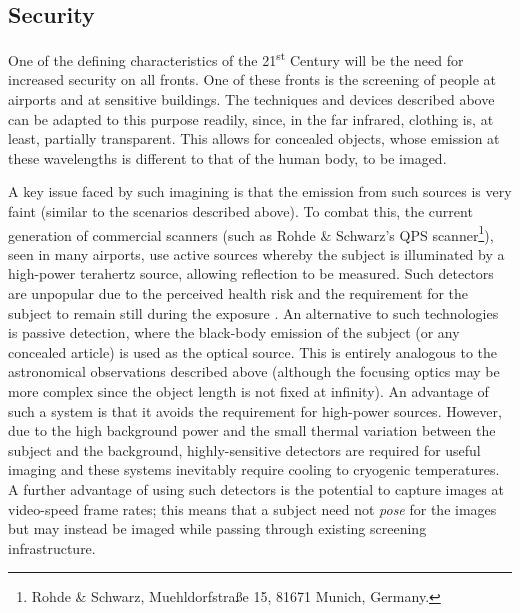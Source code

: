 \subsection{Security}\label{ssec:security}
One of the defining characteristics of the 21\textsuperscript{st} Century will be the need for increased security on all fronts. One of these fronts is the screening of people at airports and at sensitive buildings. The techniques and devices described above can be adapted to this purpose readily, since, in the far infrared, clothing is, at least, partially transparent. This allows for concealed objects, whose emission at these wavelengths is different to that of the human body, to be imaged.
\par 
A key issue faced by such imagining is that the emission from such sources is very faint (similar to the scenarios described above). To combat this, the current generation of commercial scanners (such as Rohde \& Schwarz's QPS scanner\footnote{Rohde \& Schwarz, Muehldorfstra{\ss}e 15, 81671 Munich, Germany.}), seen in many airports, use active sources whereby the subject is illuminated by a high-power terahertz source, allowing reflection to be measured. Such detectors are unpopular due to the perceived health risk and the requirement for the subject to remain still during the exposure \parencite{Topham2012,Rich2013}. An alternative to such technologies is passive detection, where the black-body emission of the subject (or any concealed article) is used as the optical source. This is entirely analogous to the astronomical observations described above (although the focusing optics may be more complex since the object length is not fixed at infinity). An advantage of such a system is that it avoids the requirement for high-power sources. However, due to the high background power and the small thermal variation between the subject and the background, highly-sensitive detectors are required for useful imaging and these systems inevitably require cooling to cryogenic temperatures. A further advantage of using such detectors is the potential to capture images at video-speed frame rates; this means that a subject need not \textit{pose} for the images but may instead be imaged while passing through existing screening infrastructure.
\par 
